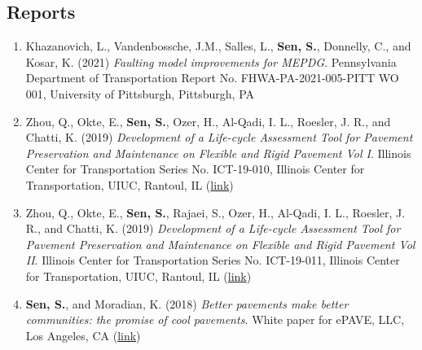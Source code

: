 \documentclass[12pt]{article}
\begin{document}
\subsection*{Reports}
\begin{enumerate}[label=(R\arabic*)]
	\item Khazanovich, L., Vandenbossche, J.M., Salles, L., \textbf{Sen, S.}, Donnelly, C., and Kosar, K. (2021) \textit{Faulting model improvements for MEPDG}. Pennsylvania Department of Transportation Report No. FHWA-PA-2021-005-PITT WO 001, University of Pittsburgh, Pittsburgh, PA 
	\item Zhou, Q., Okte, E., \textbf{Sen, S.}, Ozer, H., Al-Qadi, I. L., Roesler, J. R., and Chatti, K. (2019) \textit{Development of a Life-cycle Assessment Tool for Pavement Preservation and Maintenance on Flexible and Rigid Pavement Vol I}. Illinois Center for Transportation Series No. ICT-19-010, Illinois Center for Transportation, UIUC, Rantoul, IL (\href{https://apps.ict.illinois.edu/projects/getfile.asp?id=8865}{link})
	\item Zhou, Q., Okte, E., \textbf{Sen, S.}, Rajaei, S., Ozer, H., Al-Qadi, I. L., Roesler, J. R., and Chatti, K. (2019) \textit{Development of a Life-cycle Assessment Tool for Pavement Preservation and Maintenance on Flexible and Rigid Pavement Vol II}. Illinois Center for Transportation Series No. ICT-19-011, Illinois Center for Transportation, UIUC, Rantoul, IL (\href{https://apps.ict.illinois.edu/projects/getfile.asp?id=8866}{link})
	\item \textbf{Sen, S.}, and Moradian, K. (2018) \textit{Better pavements make better communities: the promise of cool pavements.} White paper for ePAVE, LLC, Los Angeles, CA (\href{http://www.epavellc.com/wp-content/uploads/ePAVE-White-Paper.pdf}{link})
	
\end{enumerate}
\end{document}
